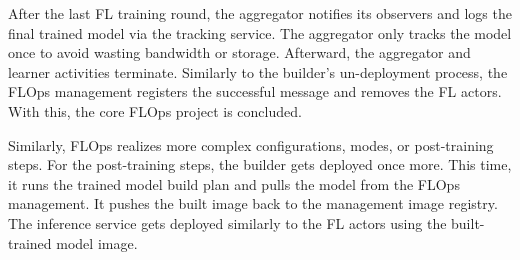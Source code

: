 After the last FL training round, the aggregator notifies its observers and logs the final trained model via the tracking service.
The aggregator only tracks the model once to avoid wasting bandwidth or storage.
Afterward, the aggregator and learner activities terminate.
Similarly to the builder's un-deployment process, the FLOps management registers the successful message and removes the FL actors.
With this, the core FLOps project is concluded.

Similarly, FLOps realizes more complex configurations, modes, or post-training steps.
For the post-training steps, the builder gets deployed once more.
This time, it runs the trained model build plan and pulls the model from the FLOps management.
It pushes the built image back to the management image registry.
The inference service gets deployed similarly to the FL actors using the built-trained model image.

